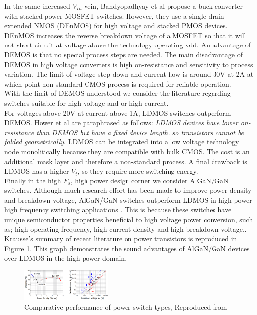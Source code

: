 \documentclass[letterpaper,twocolumn,10pt]{article}
\begin{document}
\indent In the same increased $V_{In}$ vein, Bandyopadhyay et al\cite{Bandyopadhyay2011} propose a buck converter with stacked power MOSFET switches. However, they use a single drain extended NMOS (DEnMOS) for high voltage and stacked PMOS devices. DEnMOS increases the reverse breakdown voltage of a MOSFET so that it will not short circuit at voltage above the technology operating vdd. An advantage of DEMOS is that no special process steps are needed. The main disadvantage of DEMOS in high voltage converters is high on-resistance and sensitivity to process variation. The limit of voltage step-down and current flow is around 30V at 2A \cite{Hower2005} at which point non-standard CMOS process is required for reliable operation.\\
\indent With the limit of DEMOS understood we consider the literature regarding switches suitable for high voltage and or high current.\\
For voltages above 20V at current above 1A, LDMOS switches outperform DEMOS. Hower et al\cite{Hower2005} are paraphrased as follows: \textit{LDMOS devices have lower on-resistance than DEMOS but have a fixed device length, so transistors cannot be folded geometrically}. LDMOS can be integrated into a low voltage technology node monolitically because they are compatible with bulk CMOS. The cost is an additional mask layer and therefore a non-standard process. A final drawback is LDMOS has a higher $V_t$, so they require more switching energy.\\
\indent Finally in the high $F_s$, high power design corner we consider AlGaN/GaN switches. Although much research effort has been made to improve power density and breakdown voltage, AlGaN/GaN switches outperform LDMOS in high-power high frequency switching applications \cite{Goyal2013}. This is because these switches have unique semiconductor properties beneficial to high voltage power conversion, such as; high operating frequency, high current density and high breakdown voltage\cite{Alamo2009},\cite{Mustapha2008}. Krausse's\cite{Krausse2013} summary of recent literature on power transistors is reproduced in Figure \ref{GaNCharacter}. This graph demonstrates the sound advantages of AlGaN/GaN devices over LDMOS in the high power domain.\\ %
\begin{figure}[here]
\includegraphics[width=0.4\textwidth]{TransistorPerf}
\caption{Comparative performance of power switch types, Reproduced from\cite{Krausse2013}}
\label{GaNCharacter}
\end{figure}
\end{document}
